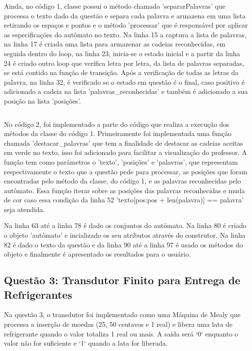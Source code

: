 \documentclass[12pt]{article}
\begin{document}
Ainda, no código 1, classe possui o método chamado 'separarPalavras' que processa o texto dado da questão e separa cada palavra e armazena em uma lista retirando os espaços e pontos e o método 'processar' que é responsável por aplicar as especificações do autômato no texto. Na linha 15 a captura a lista de palavras, na linha 17 é criada uma lista para armazenar as cadeias reconhecidas, em seguida dentro do loop, na linha 23, inicia-se o estado inicial e a partir da linha 24 é criado outro loop que verifica letra por letra, da lista de palavras separadas, se está contido na função de transição. Após a verificação de todas as letras da palavra, na linha 32, é verificado se o estado em questão é o final, caso positivo é adicionado a cadeia na lista 'palavras\_reconhecidas' e também é adicionado a sua posição na lista 'posições'.

\begin{lstlisting}[style=Python, caption={Código da implementação de teste da questão 2}]

\end{lstlisting}

No código 2, foi implementado a parte do código que realiza a execução dos métodos da classe do código 1. Primeiramente foi implementada uma função chamada 'destacar\_palavras' que tem a finalidade de destacar as cadeias aceitas em verde no texto, isso foi adicionado para facilitar a visualização do professor. A função tem como parâmetros o 'texto', 'posições' e 'palavras', que representam respectivamente o texto que a questão pede para processar, as posições que foram encontradas pelo método da classe, do código 1, e as palavras reconhecidas pelo autômato. Essa função iterar sobre as posições das palavras reconhecidas e muda de cor caso essa condição da linha 52 'texto[pos:pos + len(palavra)] == palavra' seja atendida.

Na linha 63 até a linha 78 é dado os conjuntos do autômato. Na linha 80 é criado o objeto 'autômato' e incializado os seu atributos através do construtor. Na linha 82 é dado o texto da questão e da linha 90 até a linha 97 é usado os métodos do objeto e finalmente é apresentado os resultados para o usuário.

\subsection{Questão 3: Transdutor Finito para Entrega de Refrigerantes}

Na questão 3, o transdutor foi implementado como uma Máquina de Mealy que processa a inserção de moedas (25, 50 centavos e 1 real) e libera uma lata de refrigerante quando o valor totaliza 1 real ou mais. A saída será `0` enquanto o valor não for suficiente e `1` quando a lata for liberada.
\end{document}
